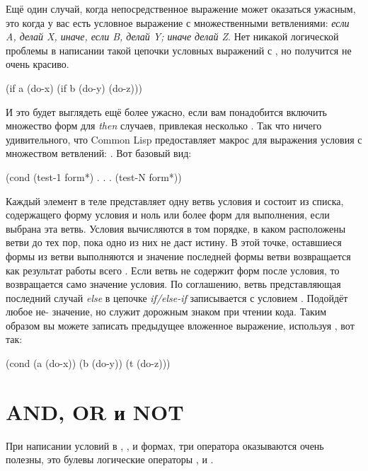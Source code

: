 Ещё один случай, когда непосредственное  выражение может оказаться ужасным, это
когда у вас есть условное выражение с множественными ветвлениями: \textit{если A, делай X,
  иначе, если B, делай Y; иначе делай Z}. Нет никакой логической проблемы в написании
такой цепочки условных выражений с , но получится не очень красиво.

\begin{myverb}
(if a
    (do-x)
    (if b
       (do-y)
       (do-z)))
\end{myverb}

И это будет выглядеть ещё более ужасно, если вам понадобится включить множество форм для
\textit{then} случаев, привлекая несколько . Так что ничего удивительного, что
Common Lisp предоставляет макрос для выражения условия с множеством ветвлений:
. Вот базовый вид:

\begin{myverb}
(cond
  (test-1 form*)
      .
      .
      .
  (test-N form*))
\end{myverb}

Каждый элемент в теле представляет одну ветвь условия и состоит из списка, содержащего
форму условия и ноль или более форм для выполнения, если выбрана эта ветвь. Условия
вычисляются в том порядке, в каком расположены ветви до тех пор, пока одно из них не даст
истину. В этой точке, оставшиеся формы из ветви выполняются и значение последней формы
ветви возвращается как результат работы всего . Если ветвь не содержит форм
после условия, то возвращается само значение условия. По соглашению, ветвь представляющая
последний случай \textit{else} в цепочке \textit{if/else-if} записывается с условием
. Подойдёт любое не- значение, но  служит дорожным знаком при
чтении кода. Таким образом вы можете записать предыдущее вложенное  выражение,
используя , вот так:

\begin{myverb}
(cond (a (do-x))
      (b (do-y))
      (t (do-z)))
\end{myverb}

\section{AND, OR и NOT}


При написании условий в , ,  и  формах, три
оператора оказываются очень полезны, это булевы логические операторы , 
и .

